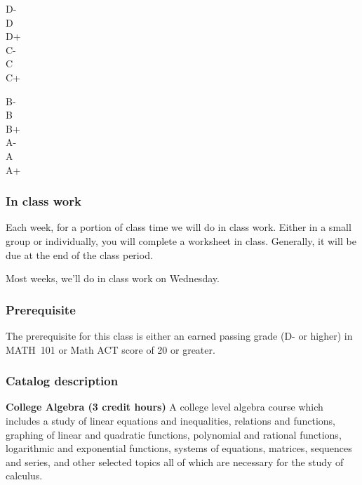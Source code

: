 \documentclass[12pt]{article}
\newcounter{on}\setcounter{on}{0}
\newcounter{ex}\setcounter{ex}{0}
\newenvironment{mypar}[2]
  {\begin{list}{}%
    {\setlength\leftmargin{#1}
    \setlength\rightmargin{#2}}
    \item[]}
  {\end{list}}
\begin{document}
 \vspace{0.1in}
     \begin{minipage}{5.5in}
  \centering 
\begin{mypar}{0.25in}{0.25in}
    \begin{minipage}{2.5in}
        D-  \dotfill \Dm \\
        D \dotfill \D \\
        D+ \dotfill \Dp \\
        C- \dotfill \Cm  \\
        C \dotfill \C \\
        C+ \dotfill \Cp 
        \end{minipage}
    \phantom{xxx}
    \begin{minipage}{2.5in}
        B- \dotfill \Bm \\
        B \dotfill  \B \\
        B+ \dotfill  \Bp\\
        A- \dotfill  \Am \\
        A \dotfill  \A \\
        A+ \dotfill  \Ap
    \end{minipage}
\end{mypar} 
\end{minipage}

\subsubsection*{In class work}

Each week, for a portion of class time we will do in class work. Either 
in a small group or individually, you will complete a worksheet in class.
Generally, it will be due at the end of the class period.

Most weeks, we'll do in class work on Wednesday. 

\subsubsection*{Prerequisite}

The prerequisite for this class is either an earned passing grade (D- or higher) in 
MATH 101 or Math ACT score of 20 or greater.  

\subsubsection*{Catalog description}


\textbf{College Algebra (3 credit hours)} A college level algebra course 
which includes a study of linear equations and inequalities, relations and 
functions, graphing of linear and quadratic functions, polynomial and
rational functions, logarithmic and exponential functions, systems of 
equations, matrices, sequences and series, and other selected topics 
all of which are necessary for the study of calculus.
\end{document}
